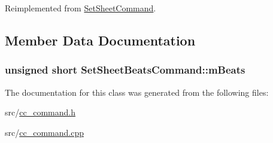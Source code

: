 Reimplemented from \hyperlink{a00134_a027700275d409b94185dfb3aa2d792bb}{Set\-Sheet\-Command}.



\subsection{Member Data Documentation}
\hypertarget{a00133_a250b3521cf446900d626a1d6a02a5ec6}{
\subsubsection[{m\-Beats}]{\setlength{\rightskip}{0pt plus 5cm}unsigned short Set\-Sheet\-Beats\-Command\-::m\-Beats\hspace{0.3cm}{\ttfamily [protected]}}}\label{a00133_a250b3521cf446900d626a1d6a02a5ec6}


The documentation for this class was generated from the following files\-:\begin{DoxyCompactItemize}
\item 
src/\hyperlink{a00183}{cc\-\_\-command.\-h}\item 
src/\hyperlink{a00182}{cc\-\_\-command.\-cpp}\end{DoxyCompactItemize}
